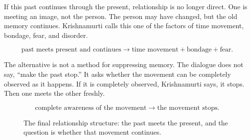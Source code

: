 If this past continues through the present, relationship is no longer direct. One is meeting an image, not the person. The person may have changed, but the old memory continues. Krishnamurti calls this one of the factors of time movement, bondage, fear, and disorder.

\begin{equation}
\text{past meets present and continues}
\longrightarrow
\text{time movement}+\text{bondage}+\text{fear}.
\end{equation}

The alternative is not a method for suppressing memory. The dialogue does not say, ``make the past stop.'' It asks whether the movement can be completely observed as it happens. If it is completely observed, Krishnamurti says, it stops. Then one meets the other freshly.

\begin{equation}
\text{complete awareness of the movement}
\longrightarrow
\text{the movement stops}.
\end{equation}

\begin{figure}
\centering
{}
\caption{The final relationship structure: the past meets the present, and the question is whether that movement continues.}
\end{figure}

